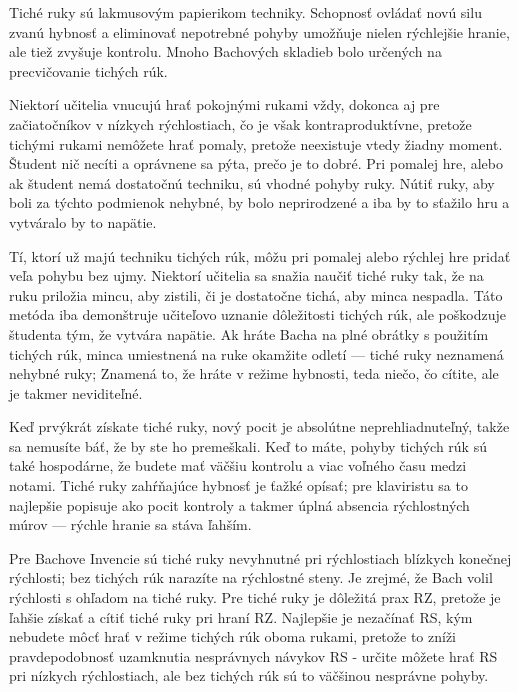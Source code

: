 \documentclass[11pt,a4paper]{book}
\begin{document}
Tiché ruky sú lakmusovým papierikom techniky. Schopnosť ovládať novú silu zvanú hybnosť a eliminovať nepotrebné pohyby umožňuje nielen rýchlejšie hranie, ale tiež zvyšuje kontrolu. Mnoho Bachových skladieb bolo určených na precvičovanie tichých rúk.

Niektorí učitelia vnucujú hrať pokojnými rukami vždy, dokonca aj pre začiatočníkov v nízkych rýchlostiach, čo je však kontraproduktívne, pretože tichými rukami nemôžete hrať pomaly, pretože neexistuje vtedy žiadny moment. Študent nič necíti a oprávnene sa pýta, prečo je to dobré. Pri pomalej hre, alebo ak študent nemá dostatočnú techniku, sú vhodné pohyby ruky. Nútiť ruky, aby boli za týchto podmienok nehybné, by bolo neprirodzené a iba by to sťažilo hru a vytváralo by to napätie.

Tí, ktorí už majú techniku ​​tichých rúk, môžu pri pomalej alebo rýchlej hre pridať veľa pohybu bez ujmy. Niektorí učitelia sa snažia naučiť tiché ruky tak, že na ruku priložia mincu, aby zistili, či je dostatočne tichá, aby minca nespadla. Táto metóda iba demonštruje učiteľovo uznanie dôležitosti tichých rúk, ale poškodzuje študenta tým, že vytvára napätie. Ak hráte Bacha na plné obrátky s použitím tichých rúk, minca umiestnená na ruke okamžite odletí — tiché ruky neznamená nehybné ruky; Znamená to, že hráte v režime hybnosti, teda niečo, čo cítite, ale je takmer neviditeľné.

Keď prvýkrát získate tiché ruky, nový pocit je absolútne neprehliadnuteľný, takže sa nemusíte báť, že by ste ho premeškali. Keď to máte, pohyby tichých rúk sú také hospodárne, že budete mať väčšiu kontrolu a viac voľného času medzi notami. Tiché ruky zahŕňajúce hybnosť je ťažké opísať; pre klaviristu sa to najlepšie popisuje ako pocit kontroly a takmer úplná absencia rýchlostných múrov — rýchle hranie sa stáva ľahším.

Pre Bachove Invencie sú tiché ruky nevyhnutné pri rýchlostiach blízkych konečnej rýchlosti; bez tichých rúk narazíte na rýchlostné steny. Je zrejmé, že Bach volil rýchlosti s ohľadom na tiché ruky. Pre tiché ruky je dôležitá prax RZ, pretože je ľahšie získať a cítiť tiché ruky pri hraní RZ. Najlepšie je nezačínať RS, kým nebudete môcť hrať v režime tichých rúk oboma rukami, pretože to zníži pravdepodobnosť uzamknutia nesprávnych návykov RS - určite môžete hrať RS pri nízkych rýchlostiach, ale bez tichých rúk sú to väčšinou nesprávne pohyby.
\end{document}
